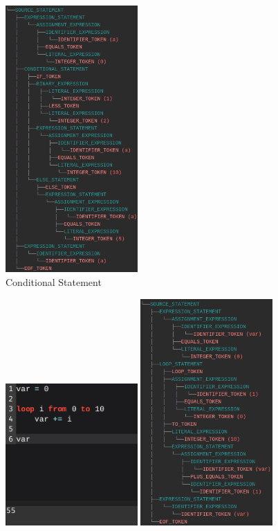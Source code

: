 \documentclass[
]{report}
\begin{document}
\begin{appendices}
\begin{figure}
		\includegraphics[width=0.45\textwidth]{conditional-tree}
		\caption{Conditional Statement}
		\label{fig:conditional-statement}
	\end{figure}
	\begin{figure}
		\centering
		\includegraphics[width=0.45\textwidth]{loop-code}
		\includegraphics[width=0.45\textwidth]{loop-tree}

\end{figure}
\end{appendices}
\end{document}

